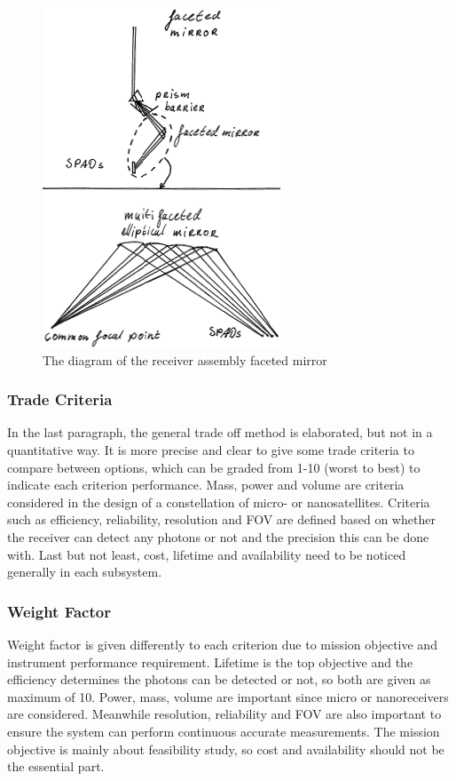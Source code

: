 \begin{figure}[ht!]
\centering
\includegraphics[scale = 0.6]{chapters/img/DiagramReceiverAssemblyFacetedMirror.png}
\caption{The diagram of the receiver assembly faceted mirror}
\label{fig:diagram_Rfaceted mirror}
\end{figure}

\subsubsection{Trade Criteria}
\label{TOReceiverC}
In the last paragraph, the general trade off method is elaborated, but not in a quantitative way. It is more precise and clear to give some trade criteria to compare between options, which can be graded from 1-10 (worst to best) to indicate each criterion performance. Mass, power and volume are criteria considered in the design of a constellation of micro- or nanosatellites. Criteria such as efficiency, reliability, resolution and \ac{FOV} are defined based on whether the receiver can detect any photons or not and the precision this can be done with. Last but not least, cost, lifetime and availability need to be noticed generally in each subsystem.

\subsubsection{Weight Factor}
\label{TOReceiverWF}
Weight factor is given differently to each criterion due to mission objective and instrument performance requirement. Lifetime is the top objective and the efficiency determines the photons can be detected or not, so both are given as maximum of 10. Power, mass, volume are important since micro or nanoreceivers are considered. Meanwhile resolution, reliability and \acs{FOV} are also important to ensure the system can perform continuous accurate measurements. The mission objective is mainly about feasibility study, so cost and availability should not be the essential part.

